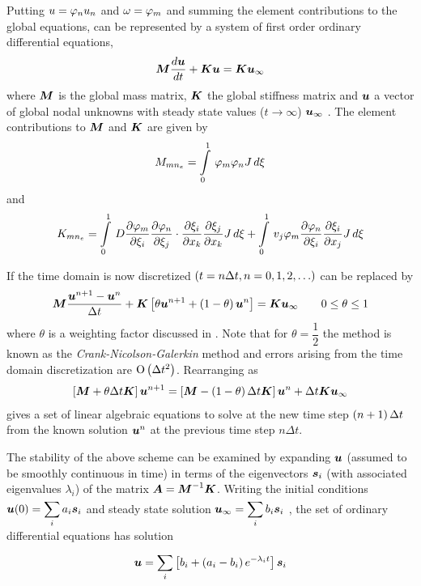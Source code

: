 Putting $u= \varphi_{n} u_{n}$ and  $\omega= \varphi_{m} $ and summing
the element contributions to the global equations,  can be 
represented by a system of first order ordinary differential equations,
\begin{equation}
  \matr{M}\dby{\vect{u}}{t} + \matr{K}\vect{u} = \matr{K}\vect{u}_{\infty}
  \label{eqn:orddiff}
\end{equation}
where $\matr{M}$ is the global mass matrix, $\matr{K}$ the global stiffness matrix
and $\vect{u}$ a vector of global nodal unknowns with steady state values ($t
\rightarrow\infty$) $\vect{u}_{\infty}$ . The element contributions to $\matr{M}$
and $\matr{K}$ are given by
\begin{equation}
  M_{{mn}_{e}} =   \displaystyle\int\limits_{0}^{1} \, \varphi_{m}   \varphi_{n}  J\,d\xi 
 \label{eqn:elemcont}
\end{equation}
and
\begin{equation}
  K_{{mn}_{e}} =   \displaystyle\int\limits_{0}^{1} \,D \dfrac{\partial  \varphi_{m} }{\partial \xi_{i}} 
   \dfrac{\partial  \varphi_{n} }{\partial \xi_{j}} \cdot  \dfrac{\partial \xi_{i}}{\partial x_{k}}  
   \dfrac{\partial \xi_{j}}{\partial x_{k}} J\,d\xi  +   \displaystyle\int\limits_{0}^{1} \,v_{j} \varphi_{m} 
   \dfrac{\partial  \varphi_{n} }{\partial \xi_{i}}  \dfrac{\partial \xi_{i}}{\partial x_{j}} J\,d\xi 
  \label{eqn:elemcont2}
\end{equation}

If the time domain is now discretized $\left( t = n \Delta t, n = 0,1,2,\ldots \right)$
 can be replaced by
\begin{equation}
  \matr{M}\dfrac{\vect{u}^{n+1}-\vect{u}^{n}}{\Delta t} +
        \matr{K}\sqbrac{\theta \vect{u}^{n+1} + \pbrac{1-\theta}\vect{u}^{n}} =
        \matr{K}\vect{u}_{\infty} \qquad 0 \leq \theta \leq 1
  \label{eqn:elemcont3}
\end{equation}
where $\theta$ is a weighting factor discussed in .
Note that for $\theta = \dfrac{1}{2}$ the method is known as the
\emph{Crank-Nicolson-Galerkin} method and errors arising from the time domain
discretization are $ \mathrm{O}\left( \Delta t^{2} \right) $. Rearranging 
as
\begin{eqnarray}
  \sqbrac{\matr{M} + \theta \Delta t \matr{K}}\vect{u}^{n+1}
  =\sqbrac{\matr{M}-\pbrac{1-\theta}\Delta t\matr{K}}\vect{u}^{n} + \Delta t 
  \matr{K}\vect{u}_{\infty}
  \label{eqn:elemcont4}
\end{eqnarray}
gives a set of linear algebraic equations to solve at the new time step
$\left( n+1 \right)\Delta t$ from the known solution $\vect{u}^{n}$ at the previous time
step $n\Delta t$.

The stability of the above scheme can be examined by expanding $\vect{u}$
(assumed to be smoothly continuous in time) in terms of the eigenvectors
$\vect{s}_{i}$ (with associated eigenvalues $\lambda_{i}$) of the matrix $\matr{A}
= \matr{M}^{-1}\matr{K}$. Writing the initial conditions $\vect{u}(0) = \dsuml{i}{}
a_{i}\vect{s}_{i}$ and steady state solution $\vect{u}_{\infty} = \dsuml{i}{}
b_{i}\vect{s}_{i}$ , the set of ordinary differential equations
 has solution
\begin{equation}
  \vect{u} = \dsuml{i}{} \sqbrac{b_{i} + \pbrac{a_{i}- b_{i}}e^{-\lambda_{i}t}}
  \vect{s}_{i}
\label{eqn:ordde}
\end{equation}


